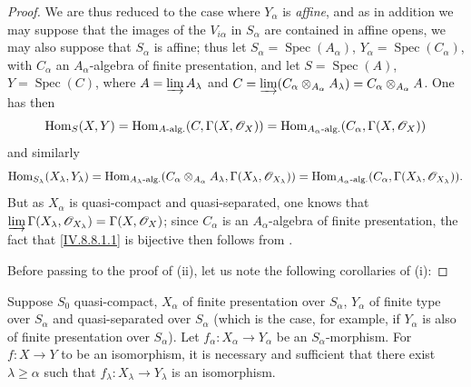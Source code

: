 \begin{proof}
We are thus reduced to the case where $Y_\alpha$ is \emph{affine}, and as in addition we may suppose that the images of the $V_{i\alpha}$ in $S_\alpha$ are contained in affine opens, we may also suppose that $S_\alpha$ is affine; thus let $S_\alpha=\operatorname{Spec}(A_\alpha)$, $Y_\alpha=\operatorname{Spec}(C_\alpha)$, with $C_\alpha$ an $A_\alpha$-algebra of finite presentation, and let $S=\operatorname{Spec}(A)$, $Y=\operatorname{Spec}(C)$, where $A=\varinjlim A_\lambda$ and $C=\varinjlim(C_\alpha\otimes_{A_\alpha}A_\lambda)=C_\alpha\otimes_{A_\alpha}A$.
One has then
\[
  \operatorname{Hom}_S(X,Y)=\operatorname{Hom}_{A\text{-alg.}}(C,\Gamma(X,\mathscr{O}_X))=\operatorname{Hom}_{A_\alpha\text{-alg.}}(C_\alpha,\Gamma(X,\mathscr{O}_X))
\]
 and similarly
\[
  \operatorname{Hom}_{S_\lambda}(X_\lambda,Y_\lambda)=\operatorname{Hom}_{A_\lambda\text{-alg.}}(C_\alpha\otimes_{A_\alpha}A_\lambda,\Gamma(X_\lambda,\mathscr{O}_{X_\lambda}))=\operatorname{Hom}_{A_\alpha\text{-alg.}}(C_\alpha,\Gamma(X_\lambda,\mathscr{O}_{X_\lambda})).
\]
But as $X_\alpha$ is quasi-compact and quasi-separated, one knows  that $\varinjlim\Gamma(X_\lambda,\mathscr{O}_{X_\lambda})=\Gamma(X,\mathscr{O}_X)$; since $C_\alpha$ is an $A_\alpha$-algebra of finite presentation, the fact that \eqref{IV.8.8.1.1} is bijective then follows from .

Before passing to the proof of (ii), let us note the following corollaries of (i):
\end{proof}

\begin{corollary}[8.8.2.4]
\label{IV.8.8.2.4}
Suppose $S_0$ quasi-compact, $X_\alpha$ of finite presentation over $S_\alpha$, $Y_\alpha$ of finite type over $S_\alpha$ and quasi-separated over $S_\alpha$ \textup{(which is the case, for example, if $Y_\alpha$ is also}
\textup{of finite presentation over $S_\alpha$)}.
Let $f_\alpha:X_\alpha\to Y_\alpha$ be an $S_\alpha$-morphism.
For $f:X\to Y$ to be an isomorphism, it is necessary and sufficient that there exist $\lambda\geqslant\alpha$ such that $f_\lambda:X_\lambda\to Y_\lambda$ is an isomorphism.
\end{corollary}

